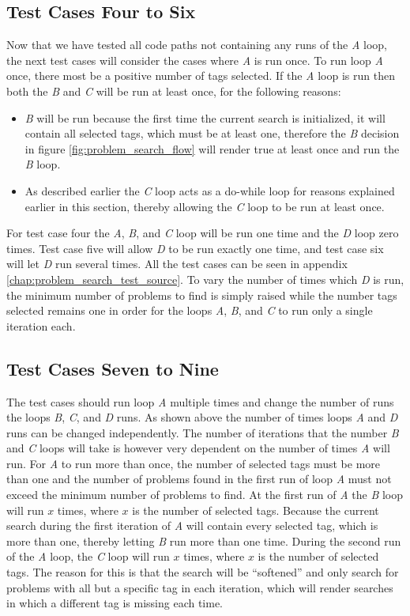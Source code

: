 \subsection{Test Cases Four to Six}
Now that we have tested all code paths not containing any runs of the \textit{A} loop, the next test cases will consider the cases where \textit{A} is run once.
To run loop \textit{A} once, there most be a positive number of tags selected.
If the \textit{A} loop is run then both the \textit{B} and \textit{C} will be run at least once, for the following reasons:
\begin{itemize}
	\item \textit{B} will be run because the first time the current search is initialized, it will contain all selected tags, which must be at least one, therefore the \textit{B} decision in figure \ref{fig:problem_search_flow} will render true at least once and run the \textit{B} loop.
	\item As described earlier the \textit{C} loop acts as a do-while loop for reasons explained earlier in this section, thereby allowing the \textit{C} loop to be run at least once.
\end{itemize}

For test case four the \textit{A}, \textit{B}, and \textit{C} loop will be run one time and the \textit{D} loop zero times.
Test case five will allow \textit{D} to be run exactly one time, and test case six will let \textit{D} run several times.
All the test cases can be seen in appendix \ref{chap:problem_search_test_source}.
To vary the number of times which \textit{D} is run, the minimum number of problems to find is simply raised while the number tags selected remains one in order for the loops \textit{A}, \textit{B}, and \textit{C} to run only a single iteration each.

\subsection{Test Cases Seven to Nine}
The test cases should run loop \textit{A} multiple times and change the number of runs the loops \textit{B}, \textit{C}, and \textit{D} runs.
As shown above the  number of times loops \textit{A} and \textit{D} runs can be changed independently.
The number of iterations that the number \textit{B} and \textit{C} loops will take is however very dependent on the number of times \textit{A} will run.
For \textit{A} to run more than once, the number of selected tags must be more than one and the number of problems found in the first run of loop \textit{A} must not exceed the minimum number of problems to find.
At the first run of \textit{A} the \textit{B} loop will run $x$ times, where $x$ is the number of selected tags.
Because the current search during the first iteration of \textit{A} will contain every selected tag, which is more than one, thereby letting \textit{B} run more than one time.
During the second run of the \textit{A} loop, the \textit{C} loop will run $x$ times, where $x$ is the number of selected tags.
The reason for this is that the search will be ``softened'' and only search for problems with all but a specific tag in each iteration, which will render searches in which a different tag is missing each time. 

